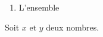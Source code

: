     \begin{enumerate}
        \item L'ensemble
    \end{enumerate}

    Soit $x \text{ et } y$ deux nombres.
